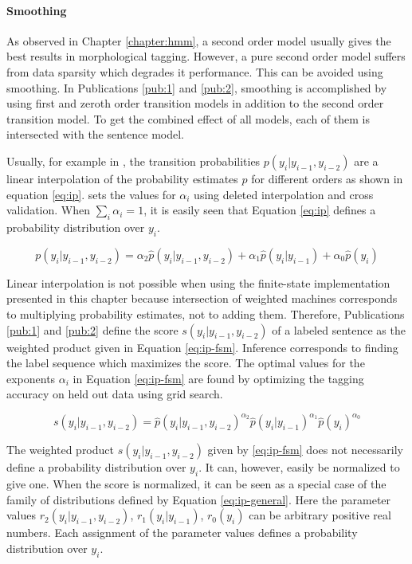 \paragraph{Smoothing} As observed in Chapter \ref{chapter:hmm}, a
second order model usually gives the best results in morphological
tagging. However, a pure second order model suffers from data sparsity
which degrades it performance. This can be avoided using smoothing. In
Publications \ref{pub:1} and \ref{pub:2}, smoothing is accomplished by
using first and zeroth order transition models in addition to the
second order transition model. To get the combined effect of all
models, each of them is intersected with the sentence model.

Usually, for example in \cite{Brants2000}, the transition
probabilities $p(y_i|y_{i-1}, y_{i-2})$ are a linear interpolation of
the probability estimates $\hat{p}$ for different orders as shown in
equation \ref{eq:ip}. \cite{Brants2000} sets the values for $\alpha_i$
using deleted interpolation and cross validation. When $\sum_i
\alpha_i = 1$, it is easily seen that Equation \ref{eq:ip} defines a
probability distribution over $y_i$.

\begin{equation}
p(y_i|y_{i-1}, y_{i-2}) = \alpha_2\hat{p}(y_i|y_{i-1},y_{i-2}) + \alpha_1\hat{p}(y_i|y_{i-1}) + \alpha_0\hat{p}(y_i)\label{eq:ip}
\end{equation}

Linear interpolation is not possible when using the finite-state
implementation presented in this chapter because intersection of
weighted machines corresponds to multiplying probability estimates,
not to adding them. Therefore, Publications \ref{pub:1} and
\ref{pub:2} define the score $s(y_i|y_{i-1}, y_{i-2})$ of a labeled
sentence as the weighted product given in Equation
\ref{eq:ip-fsm}. Inference corresponds to finding the label sequence
which maximizes the score. The optimal values for the exponents
$\alpha_i$ in Equation \ref{eq:ip-fsm} are found by optimizing the
tagging accuracy on held out data using grid search.

\begin{equation}
s(y_i|y_{i-1}, y_{i-2}) = \hat{p}(y_i|y_{i-1},y_{i-2})^{\alpha_2} \hat{p}(y_i|y_{i-1})^{\alpha_1}\hat{p}(y_i)^{\alpha_0}\label{eq:ip-fsm}
\end{equation}

The weighted product $s(y_i|y_{i-1}, y_{i-2})$ given by
\ref{eq:ip-fsm} does not necessarily define a probability distribution
over $y_i$. It can, however, easily be normalized to give one. When the
score is normalized, it can be seen as a special case of the family of
distributions defined by Equation \ref{eq:ip-general}. Here the
parameter values $r_2(y_i|y_{i-1},y_{i-2})$, $r_1(y_i|y_{i-1})$,
$r_0(y_i)$ can be arbitrary positive real numbers. Each assignment of
the parameter values defines a probability distribution over $y_i$.

